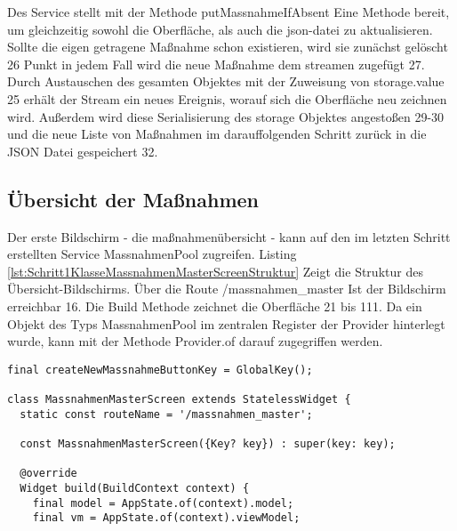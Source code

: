 { Des Service stellt mit der Methode putMassnahmeIfAbsent Eine Methode bereit, um gleichzeitig  sowohl die Oberfläche,  als auch die json-datei  zu aktualisieren.  Sollte die eigen getragene Maßnahme schon existieren, wird sie zunächst gelöscht 26 Punkt in jedem Fall wird die neue Maßnahme dem streamen zugefügt 27. Durch Austauschen des gesamten Objektes mit der Zuweisung von storage.value  25 erhält der Stream ein neues Ereignis, worauf sich die Oberfläche neu zeichnen wird. Außerdem wird diese Serialisierung des storage Objektes angestoßen 29-30  und die neue Liste von Maßnahmen im darauffolgenden Schritt zurück in die JSON Datei gespeichert 32.

 \subsection{Übersicht der Maßnahmen}
 
 Der erste Bildschirm - die maßnahmenübersicht - kann auf den im letzten Schritt  erstellten Service MassnahmenPool zugreifen. Listing \ref{lst:Schritt1KlasseMassnahmenMasterScreenStruktur}  Zeigt die Struktur des Übersicht-Bildschirms. Über die Route /massnahmen_master Ist der Bildschirm erreichbar 16. Die Build Methode zeichnet die Oberfläche 21 bis 111.  Da ein Objekt des Typs 
 MassnahmenPool im zentralen  Register der Provider hinterlegt wurde, kann mit der Methode Provider.of darauf zugegriffen werden.
  
\ifincludeall
  \begin{listing}[htbp]
    \renewcommand\theFancyVerbLine{%
      \ifnum\value{FancyVerbLine}=31
      \setcounter{FancyVerbLine}{85}
      \tiny\ldots
      \else
      \tiny\arabic{FancyVerbLine}%
      \fi
    }
    \begin{verbatim}
final createNewMassnahmeButtonKey = GlobalKey();

class MassnahmenMasterScreen extends StatelessWidget {
  static const routeName = '/massnahmen_master';

  const MassnahmenMasterScreen({Key? key}) : super(key: key);

  @override
  Widget build(BuildContext context) {
    final model = AppState.of(context).model;
    final vm = AppState.of(context).viewModel;


\end{verbatim}
\end{listing}}
